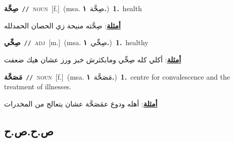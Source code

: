 \documentclass[10pt,a4paper,twoside]{article} %
\begin{document}
\begin{multicols}{2}
{{{{{{{{{{\setlength\topsep{0pt}\textbf{\foreignlanguage{arabic}{صِحَّة}}\ {\color{gray}\texttt{//}\color{black}}\ \textsc{noun}\ [f.]\ \color{gray}(msa. \foreignlanguage{arabic}{صِحَّة}~\foreignlanguage{arabic}{\textbf{١.}})\color{black}\ \textbf{1.}~health\  \begin{flushright}\color{gray}\foreignlanguage{arabic}{\textbf{\underline{\foreignlanguage{arabic}{أمثلة}}}: صِحَّته منيحة زي الحصان الحمدلله}\end{flushright}\color{black}} \vspace{2mm}

{\setlength\topsep{0pt}\textbf{\foreignlanguage{arabic}{صِحِّي}}\ {\color{gray}\texttt{//}\color{black}}\ \textsc{adj}\ [m.]\ \color{gray}(msa. \foreignlanguage{arabic}{صِحِّي}~\foreignlanguage{arabic}{\textbf{١.}})\color{black}\ \textbf{1.}~healthy\  \begin{flushright}\color{gray}\foreignlanguage{arabic}{\textbf{\underline{\foreignlanguage{arabic}{أمثلة}}}: أكلي كله صِحِّي ومابكثرش خبز ورز عشان هيك ضعفت}\end{flushright}\color{black}} \vspace{2mm}

{\setlength\topsep{0pt}\textbf{\foreignlanguage{arabic}{مَصَحَّة}}\ {\color{gray}\texttt{//}\color{black}}\ \textsc{noun}\ [f.]\ \color{gray}(msa. \foreignlanguage{arabic}{مَصَحَّة}~\foreignlanguage{arabic}{\textbf{١.}})\color{black}\ \textbf{1.}~centre for convalescence and the treatment of illnesses.\  \begin{flushright}\color{gray}\foreignlanguage{arabic}{\textbf{\underline{\foreignlanguage{arabic}{أمثلة}}}: أهله ودوع عمَصَحَّة عشان يتعالج من المخدرات}\end{flushright}\color{black}} \vspace{2mm}

\vspace{-3mm}
\subsection*{\color{blue}\foreignlanguage{arabic}{ص.ح.ص.ح}\color{blue}{}} 

}}}}}}}}}
\end{multicols}
\end{document}
